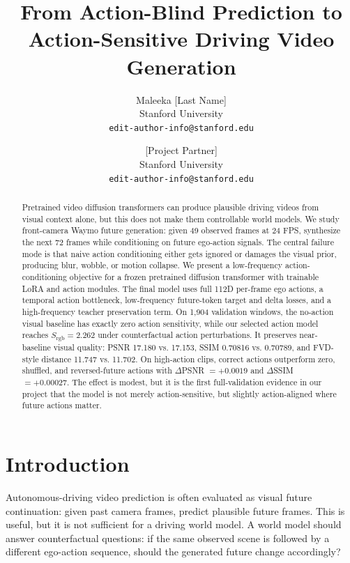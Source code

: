 \documentclass[10pt,twocolumn,letterpaper]{article}
\newcommand{\srgb}{S_{\mathrm{rgb}}}
\begin{document}
\title{From Action-Blind Prediction to Action-Sensitive Driving Video Generation}

\author{Maleeka [Last Name]\\
Stanford University\\
{\tt\small edit-author-info@stanford.edu}
\and
[Project Partner]\\
Stanford University\\
{\tt\small edit-author-info@stanford.edu}}

\maketitle

\begin{abstract}
Pretrained video diffusion transformers can produce plausible driving videos from visual context alone, but this does not make them controllable world models. We study front-camera Waymo future generation: given 49 observed frames at 24 FPS, synthesize the next 72 frames while conditioning on future ego-action signals. The central failure mode is that naive action conditioning either gets ignored or damages the visual prior, producing blur, wobble, or motion collapse. We present a low-frequency action-conditioning objective for a frozen pretrained diffusion transformer with trainable LoRA and action modules. The final model uses full 112D per-frame ego actions, a temporal action bottleneck, low-frequency future-token target and delta losses, and a high-frequency teacher preservation term. On 1,904 validation windows, the no-action visual baseline has exactly zero action sensitivity, while our selected action model reaches $\srgb=2.262$ under counterfactual action perturbations. It preserves near-baseline visual quality: PSNR 17.180 vs. 17.153, SSIM 0.70816 vs. 0.70789, and FVD-style distance 11.747 vs. 11.702. On high-action clips, correct actions outperform zero, shuffled, and reversed-future actions with $\Delta$PSNR $=+0.0019$ and $\Delta$SSIM $=+0.00027$. The effect is modest, but it is the first full-validation evidence in our project that the model is not merely action-sensitive, but slightly action-aligned where future actions matter.
\end{abstract}

\section{Introduction}

Autonomous-driving video prediction is often evaluated as visual future continuation: given past camera frames, predict plausible future frames. This is useful, but it is not sufficient for a driving world model. A world model should answer counterfactual questions: if the same observed scene is followed by a different ego-action sequence, should the generated future change accordingly?
\end{document}
